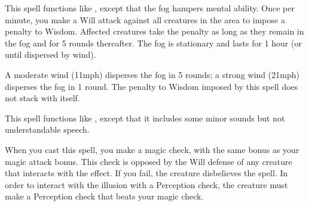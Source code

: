 \spellrng{\rngclose}
\begin{spelleffect}
  This spell functions like , except that the fog hampers mental ability. Once per minute, you make a Will attack against all creatures in the area to impose a  penalty to Wisdom. Affected creatures take the penalty as long as they remain in the fog and for 5 rounds thereafter. The fog is stationary and lasts for 1 hour (or until dispersed by wind).
\end{spelleffect}
\begin{spellnotes}
  A moderate wind (11\add mph) disperses the fog in 5 rounds; a strong wind (21\add mph) disperses the fog in 1 round. The penalty to Wisdom imposed by this spell does not stack with itself.
\end{spellnotes}

\begin{spelleffect}
  This spell functions like , except that it includes some minor sounds but not understandable speech.
\end{spelleffect}
\begin{spellnotes}
    When you cast this spell, you make a magic check, with the same bonus as your magic attack bonus. This check is opposed by the Will defense of any creature that interacts with the effect. If you fail, the creature disbelieves the spell. In order to interact with the illusion with a Perception check, the creature must make a Perception check that beats your magic check.
\end{spellnotes}

